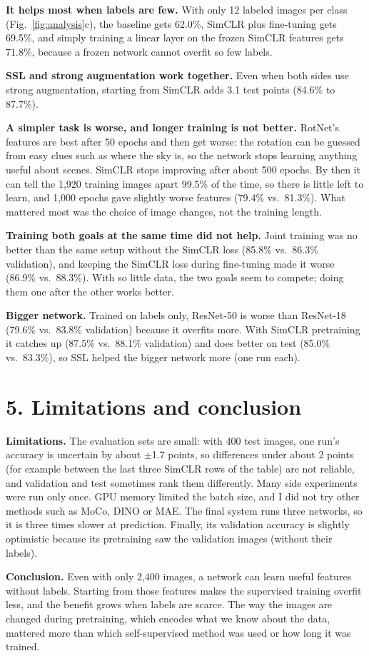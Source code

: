 \documentclass[10pt]{article}
\begin{document}
\textbf{It helps most when labels are few.} With only 12 labeled images per class
(Fig.~\ref{fig:analysis}c), the baseline gets 62.0\%, SimCLR plus fine-tuning gets 69.5\%, and
simply training a linear layer on the frozen SimCLR features gets 71.8\%, because a frozen network
cannot overfit so few labels.

\textbf{SSL and strong augmentation work together.} Even when both sides use strong augmentation,
starting from SimCLR adds 3.1 test points (84.6\% to 87.7\%).

\textbf{A simpler task is worse, and longer training is not better.} RotNet's features are best
after 50 epochs and then get worse: the rotation can be guessed from easy clues such as where the
sky is, so the network stops learning anything useful about scenes. SimCLR stops improving after
about 500 epochs. By then it can tell the 1,920 training images apart 99.5\% of the time, so there
is little left to learn, and 1,000 epochs gave slightly worse features (79.4\% vs.\ 81.3\%). What
mattered most was the choice of image changes, not the training length.

\textbf{Training both goals at the same time did not help.} Joint training was no better than the
same setup without the SimCLR loss (85.8\% vs.\ 86.3\% validation), and keeping the SimCLR loss
during fine-tuning made it worse (86.9\% vs.\ 88.3\%). With so little data, the two goals seem to
compete; doing them one after the other works better.

\textbf{Bigger network.} Trained on labels only, ResNet-50 is worse than ResNet-18 (79.6\% vs.\
83.8\% validation) because it overfits more. With SimCLR pretraining it catches up (87.5\% vs.\
88.1\% validation) and does better on test (85.0\% vs.\ 83.3\%), so SSL helped the bigger network
more (one run each).

\section*{5. Limitations and conclusion}
\textbf{Limitations.} The evaluation sets are small: with 400 test images, one run's accuracy is
uncertain by about $\pm$1.7 points, so differences under about 2 points (for example between the last
three SimCLR rows of the table) are not reliable, and validation and test sometimes rank them
differently. Many side experiments were run only once. GPU memory limited the batch size, and I did
not try other methods such as MoCo, DINO or MAE. The final system runs three networks, so it is three
times slower at prediction. Finally, its validation accuracy is slightly optimistic because its
pretraining saw the validation images (without their labels).

\textbf{Conclusion.} Even with only 2,400 images, a network can learn useful features without labels.
Starting from those features makes the supervised training overfit less, and the benefit grows when
labels are scarce. The way the images are changed during pretraining, which encodes what we know about
the data, mattered more than which self-supervised method was used or how long it was trained.
\end{document}
